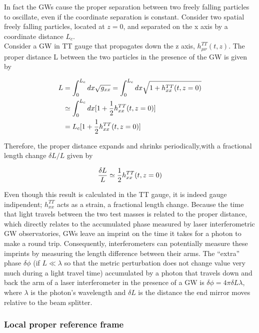 \documentclass[binding=0.6cm, LaM]{sapthesis}
\begin{document}
	In fact the GWs cause the proper separation between two freely falling particles to oscillate, 
	even if the coordinate separation is constant. Consider two spatial freely falling particles, 
	located at $z = 0$, and separated on the x axis by a coordinate distance $L_c$. \\
	Consider a GW in TT gauge that propagates down the z axis, $h^{TT}_{\mu\nu}(t,z)$. 
	The proper distance L between the two particles in the presence of the GW is given by

		\begin{align}
		L & = \int^{L_c}_{0}{dx\sqrt{g_{xx}}} = \int^{L_c}_{0}dx\sqrt{1 + h^{TT}_{xx}(t,z=0)} \\
		& \simeq \int^{L_c}_{0}{dx[1 + {1 \over 2}h^{TT}_{xx}(t,z=0)]} \\
		&= L_c[1 + {1 \over 2}h^{TT}_{xx}(t,z=0)]
		\end{align}

	Therefore, the proper distance expands and shrinks periodically,with a fractional length change $\delta L/L$ given by

		\begin{equation}
		{{\delta L}\over{L}} \simeq {1 \over 2} h_{xx}^{TT}(t,z=0)
		\end{equation}

	Even though this result is calculated in the TT gauge, it is indeed gauge indipendent;
	$h_{xx}^{TT}$ acts as a strain, a fractional length change.
	Because the time that light travels between the two test masses is related to the proper distance,  
	which directly relates to the accumulated phase measured by laser interferometric GW observatories,
	GWs leave an imprint on the time it takes for a photon to make a round trip. 
	Consequently, interferometers can potentially measure these imprints by measuring the length difference between
	their arms. The “extra” phase $\delta \phi$ (if $L \ll \lambda$ so that the metric perturbation 
	does not change value very much during a light travel time) accumulated by a photon that travels
	down and back the arm of a laser interferometer in the presence of a GW is $\delta \phi = 4\pi \delta L \lambda$, 
	where $\lambda$ is the photon’s wavelength and $\delta L$ is the distance
	the end mirror moves relative to the beam splitter.


\subsubsection{Local proper reference frame}
\end{document}
